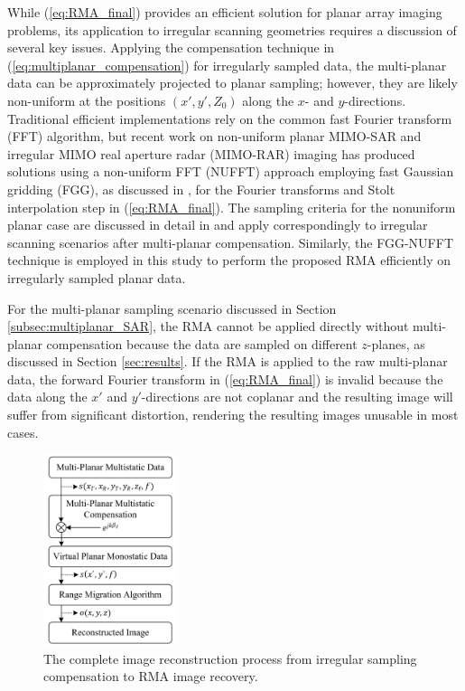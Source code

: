 \documentclass{ieeeaccess}
\begin{document}
While (\ref{eq:RMA_final}) provides an efficient solution for planar array imaging problems, its application to irregular scanning geometries requires a discussion of several key issues.
Applying the compensation technique in (\ref{eq:multiplanar_compensation}) for irregularly sampled data, the multi-planar data can be approximately projected to planar sampling; however, they are likely non-uniform at the positions $(x',y',Z_0)$ along the $x$- and $y$-directions.
Traditional efficient implementations rely on the common fast Fourier transform (FFT) algorithm, but recent work on non-uniform planar MIMO-SAR \cite{gao2018_1D_MIMO,fan2020linearMIMOArbitraryTopologies} and irregular MIMO real aperture radar (MIMO-RAR) \cite{wang20203} imaging has produced solutions using a non-uniform FFT (NUFFT) approach employing fast Gaussian gridding (FGG), as discussed in \cite{greengard2006nufft}, for the Fourier transforms and Stolt interpolation step in (\ref{eq:RMA_final}). 
The sampling criteria for the nonuniform planar case are discussed in detail in \cite{gao2018_1D_MIMO,fan2020linearMIMOArbitraryTopologies,wang20203} and apply correspondingly to irregular scanning scenarios after multi-planar compensation. 
Similarly, the FGG-NUFFT technique is employed in this study to perform the proposed RMA efficiently on irregularly sampled planar data.

For the multi-planar sampling scenario discussed in Section \ref{subsec:multiplanar_SAR}, the RMA cannot be applied directly without multi-planar compensation because the data are sampled on different $z$-planes, as discussed in Section \ref{sec:results}.
If the RMA is applied to the raw multi-planar data, the forward Fourier transform in (\ref{eq:RMA_final}) is invalid because the data along the $x'$ and $y'$-directions are not coplanar and the resulting image will suffer from significant distortion, rendering the resulting images unusable in most cases.

\begin{figure}[h]
    \centering
    \includegraphics[width=0.35\textwidth]{smith3.png}
    \caption{The complete image reconstruction process from irregular sampling compensation to RMA image recovery.}
    \label{fig:image_reconstruction_process_complete}
\end{figure} 
\end{document}
